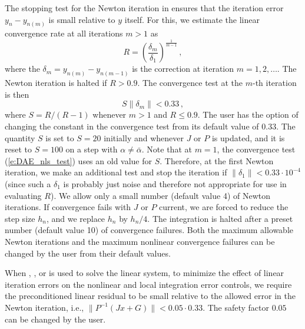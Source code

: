 The stopping test for the Newton iteration
in {\ida} ensures that the iteration error $y_n - y_{n(m)}$ is small relative
to $y$ itself. For this, we estimate the linear convergence rate at all 
iterations $m>1$ as
\begin{equation*}
R = \left( \frac{\delta_m}{\delta_1} \right)^{\frac{1}{m-1}} \, , 
\end{equation*}
where the $\delta_m = y_{n(m)} - y_{n(m-1)}$ is the correction at
iteration $m=1,2,\ldots$. The Newton iteration is halted if $R>0.9$.
The convergence test at the $m$-th iteration is then
\begin{equation}\label{e:DAE_nls_test}
S \| \delta_m \| < 0.33 \, ,
\end{equation}
where $S = R/(R-1)$ whenever $m>1$ and $R\le 0.9$. The user has the
option of changing the constant in the convergence test from its default 
value of $0.33$.
%
The quantity $S$ is set to $S=20$ initially and whenever $J$ or $P$ is
updated, and it is reset to $S=100$ on a step with $\alpha \neq \bar\alpha$.
Note that at $m=1$, the convergence test (\ref{e:DAE_nls_test}) uses an old 
value for $S$. Therefore, at the first Newton iteration, we make an additional
test and stop the iteration if $\|\delta_1\| < 0.33 \cdot 10^{-4}$
(since such a $\delta_1$ is probably just noise and therefore not appropriate 
for use in evaluating $R$).
%
We allow only a small number (default value 4) of Newton iterations.
If convergence fails with $J$ or $P$ current, 
we are forced to reduce the step size $h_n$, and we replace $h_n$ by $h_n/4$.
The integration is halted after a preset number (default value 10)
of convergence failures. Both the maximum allowable Newton iterations
and the maximum nonlinear convergence failures can be changed by the user
from their default values.

When {\spgmr}, {\spbcg}, or {\sptfqmr} is used to solve the linear system, to
minimize the effect of linear iteration errors on the nonlinear and local integration
error controls, we require the preconditioned linear residual to be small relative to
the allowed error in the Newton iteration, i.e., 
$\| P^{-1}(Jx+G) \| < 0.05 \cdot 0.33$.
The safety factor $0.05$ can be changed by the user.

